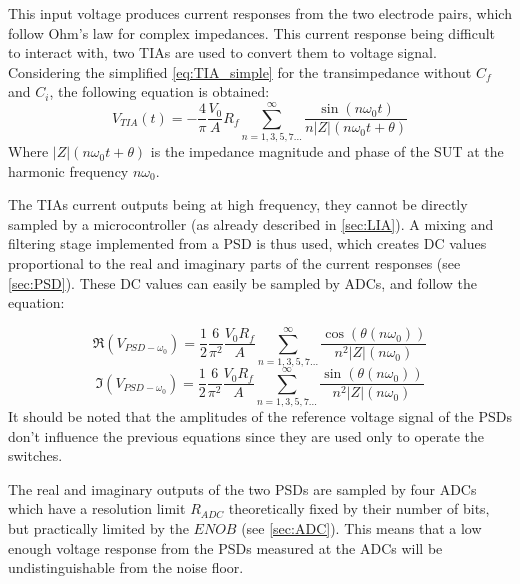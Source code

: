 This input voltage produces current responses from the two electrode pairs, which follow Ohm's law for complex impedances. This current response being difficult to interact with, two TIAs are used to convert them to voltage signal. Considering the simplified \autoref{eq:TIA_simple} for the transimpedance without $C_f$ and $C_i$, the following equation is obtained:
\begin{equation}
\label{eq:V_TIA}
   V_{TIA}(t) = -\frac{4}{\pi} \frac{V_0}{A} R_f \displaystyle\sum_{n=1,3,5,7...} ^{\infty} \frac{\sin(n \omega_0 t)}{n\lvert Z \rvert (n \omega_0 t + \theta)}
\end{equation}
Where $\lvert Z \rvert (n \omega_0 t + \theta)$ is the impedance magnitude and phase of the SUT at the harmonic frequency $n \omega_0$.  \par

The TIAs current outputs being at high frequency, they cannot be directly sampled by a microcontroller (as already described in \autoref{sec:LIA}). A mixing and filtering stage implemented from a PSD is thus used, which creates DC values proportional to the real and imaginary parts of the current responses (see \autoref{sec:PSD}). These DC values can easily be sampled by ADCs, and follow the equation: \par
\begin{equation}
\label{eq:RealPSD}
   \Re(V_{PSD-\omega_0}) = \frac{1}{2} \frac{6}{\pi^2} \frac{V_0 R_f}{A} \displaystyle\sum_{n=1,3,5,7...} ^{\infty} \frac{\cos(\theta(n \omega_0))}{n^2\lvert Z \rvert (n \omega_0)}
\end{equation}
\begin{equation}
\label{eq:ImPSD}
   \Im(V_{PSD-\omega_0}) = \frac{1}{2} \frac{6}{\pi^2} \frac{V_0 R_f}{A} \displaystyle\sum_{n=1,3,5,7...} ^{\infty} \frac{\sin(\theta(n \omega_0))}{n^2\lvert Z \rvert (n \omega_0)}
\end{equation}
It should be noted that the amplitudes of the reference voltage signal of the PSDs don't influence the previous equations since they are used only to operate the switches. \par 

The real and imaginary outputs of the two PSDs are sampled by four ADCs which have a resolution limit $R_{ADC}$ theoretically fixed by their number of bits, but practically limited by the $ENOB$ (see \autoref{sec:ADC}). This means that a low enough voltage response from the PSDs measured at the ADCs will be undistinguishable from the noise floor. \par

